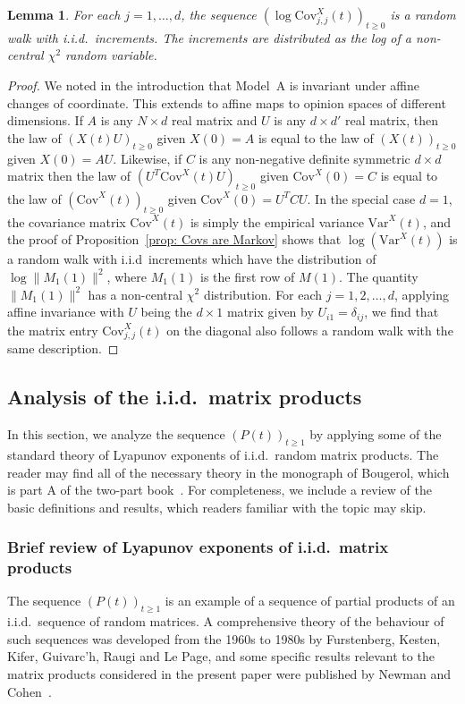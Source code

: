 \documentclass[12pt]{article}
\newtheorem{lemma}{Lemma}
\newcommand{\Cov}{\mathrm{Cov}}
\newcommand{\1}{\mathbf{1}}
\begin{document}
\begin{lemma}\label{L: empirical variances of single coordinates are random walks}
For each $j = 1, \dots, d$, the sequence $\left(\log \mathrm{Cov}^X_{j,j}(t)\right)_{t \ge 0}$ is a random walk with i.i.d.~increments. The increments are distributed as the log of a non-central $\chi^2$ random variable. 
\end{lemma} 
\begin{proof} We noted in the introduction that Model~A is invariant under affine changes of coordinate. This extends to affine maps to opinion spaces of different dimensions. If $A$ is any $N\times d$ real matrix and $U$ is any $d\times d'$ real matrix, then the law of $(X(t)U)_{t \ge 0}$ given $X(0)  = A$ is equal to the law of $\left(X(t)\right)_{t \ge 0}$ given $X(0) = AU$. Likewise, if $C$ is any non-negative definite symmetric $d\times d$ matrix then the law of  $\left(U^T\Cov^X(t)U\right)_{t \ge 0}$ given $\Cov^X(0) = C$ is equal to the law of $\left(\Cov^X(t)\right)_{t \ge 0}$ given $\Cov^X(0) = U^T C U$. In the special case $d=1$, the covariance matrix $\Cov^X(t)$ is simply the empirical variance $\mathrm{Var}^X(t)$, and the proof of Proposition~\ref{prop: Covs are Markov} shows that $\log(\mathrm{Var}^X(t))$ is a random walk with i.i.d~increments which have the distribution of $\log \|M_1(1)\|^2$, where $M_1(1)$ is the first row of $M(1)$. The quantity $\|M_1(1)\|^2$ has a non-central $\chi^2$ distribution. For each $j=1,2,\dots,d$, applying affine invariance with $U$ being the $d\times 1$ matrix given by $U_{i1} = \delta_{ij}$, we find that the matrix entry $\Cov^X_{j,j}(t)$ on the diagonal also follows a random walk with the same description.
\end{proof}

\subsection{Analysis of the i.i.d.~matrix products}
In this section, we analyze the sequence $(P(t))_{t \ge 1}$ by applying some of the standard theory of Lyapunov exponents of i.i.d.~random matrix products. The reader may find all of the necessary theory in the monograph of Bougerol, which is part A of the two-part book~\cite{BougerolLacroix}. For completeness, we include a review of the basic definitions and results, which readers familiar with the topic may skip.

\subsubsection{Brief review of Lyapunov exponents of i.i.d.~matrix products}\label{Lyapexp}
The sequence $\left(P(t)\right)_{t \ge 1}$ is an example of a sequence of partial products of an i.i.d.~sequence of random matrices. A comprehensive theory of the behaviour of such sequences was developed from the 1960s to 1980s by Furstenberg, Kesten, Kifer, Guivarc'h, Raugi and Le Page, and some specific results relevant to the matrix products considered in the present paper were published by Newman and Cohen~\cite{CohenNewman}.  
\end{document}

